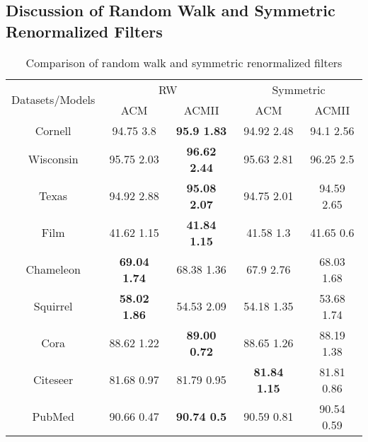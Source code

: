 \documentclass{article}
\newcommand{\0}{{\boldsymbol{0}}}
\newcommand{\6}{{\partial}}
\newcommand{\8}{{\infty}}
\newcommand{\4}{{\nabla}}
\begin{document}
\subsection{Discussion of Random Walk and Symmetric Renormalized Filters}
\label{appendix:rw_symmetric_comparision}
\begin{table}[htbp]
  \centering
  \caption{Comparison of random walk and symmetric renormalized filters}
    \begin{tabular}{c|cc|cc}
    \toprule
    \toprule
    \multirow{2}[4]{*}{Datasets/Models} & \multicolumn{2}{c|}{RW} & \multicolumn{2}{c}{Symmetric} \\
\cmidrule{2-5}          & ACM   & ACMII & ACM   & ACMII \\
    \midrule
    Cornell & 94.75  3.8 & \cellcolor[rgb]{ .647,  .647,  .647}\textbf{95.9  1.83} & 94.92  2.48 & 94.1  2.56 \\
    Wisconsin & 95.75  2.03 & \cellcolor[rgb]{ .647,  .647,  .647}\textbf{96.62  2.44} & 95.63  2.81 & 96.25  2.5 \\
    Texas & 94.92  2.88 & \cellcolor[rgb]{ .647,  .647,  .647}\textbf{95.08  2.07} & 94.75  2.01 & 94.59  2.65 \\
    Film  & 41.62  1.15 & \cellcolor[rgb]{ .647,  .647,  .647}\textbf{41.84  1.15} & 41.58  1.3 & 41.65  0.6 \\
    Chameleon & \cellcolor[rgb]{ .647,  .647,  .647}\textbf{69.04  1.74} & 68.38  1.36 & 67.9  2.76 & 68.03  1.68 \\
    Squirrel & \cellcolor[rgb]{ .647,  .647,  .647}\textbf{58.02  1.86} & 54.53  2.09 & 54.18  1.35 & 53.68  1.74  \\
    Cora  & 88.62  1.22 & \cellcolor[rgb]{ .647,  .647,  .647}\textbf{89.00  0.72} & 88.65  1.26 & 88.19  1.38 \\
    Citeseer & 81.68  0.97 & 81.79  0.95 & \cellcolor[rgb]{ .647,  .647,  .647}\textbf{81.84  1.15} & 81.81  0.86 \\
    PubMed & 90.66  0.47 & \cellcolor[rgb]{ .647,  .647,  .647}\textbf{90.74  0.5} & 90.59  0.81 & 90.54  0.59 \\
    \bottomrule
    \bottomrule
    \end{tabular}\label{tab:rw_symmetric_filter_comparison}\end{table}%
\end{document}
